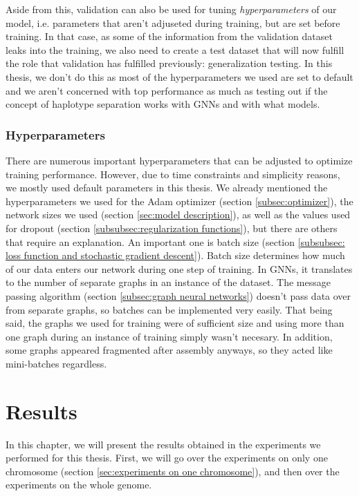 \documentclass[times, utf8, diplomski, english]{fer_eng}
\begin{document}
Aside from this, validation can also be used for tuning \textit{hyperparameters} of our model, i.e. parameters that aren't adjuseted during training, but are set before training. In that case, as some of the information from the validation dataset leaks into the training,  we also need to create a test dataset that will now fulfill the role that validation has fulfilled previously: generalization testing. In this thesis, we don't do this as most of the hyperparameters we used are set to default and we aren't concerned with top performance as much as testing out if the concept of haplotype separation works with GNNs and with what models.

\subsection{Hyperparameters}
\label{subsec:hyperparameters}

There are numerous important hyperparameters that can be adjusted to optimize training performance. However, due to time constraints and simplicity reasons, we mostly used default parameters in this thesis. We already mentioned the hyperparameters we used for the Adam optimizer (section \ref{subsec:optimizer}), the network sizes we used (section \ref{sec:model description}), as well as the values used for dropout (section \ref{subsubsec:regularization functions}), but there are others that require an explanation. An important one is batch size (section \ref{subsubsec: loss function and stochastic gradient descent}). Batch size determines how much of our data enters our network during one step of training. In GNNs, it translates to the number of separate graphs in an instance of the dataset. The message passing algorithm (section \ref{subsec:graph neural networks}) doesn't pass data over from separate graphs, so batches can be implemented very easily. That being said, the graphs we used for training were of sufficient size and using more than one graph during an instance of training simply wasn't necesary. In addition, some graphs appeared fragmented after assembly anyways, so they acted like mini-batches regardless.

\chapter{Results}
\label{ch:results}

In this chapter, we will present the results obtained in the experiments we performed for this thesis. First, we will go over the experiments on only one chromosome (section \ref{sec:experiments on one chromosome}), and then over the experiments on the whole genome.
\end{document}
